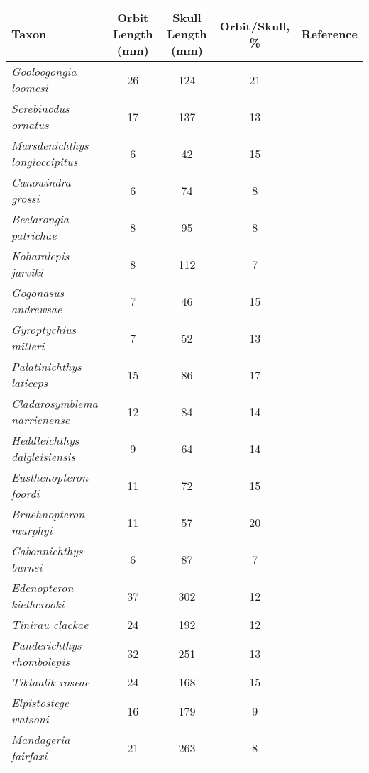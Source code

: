 \begin{tabular}{|L{4.5cm}|c|c|c|L{4.5cm}|}
\hline
\textbf{Taxon}&\textbf{Orbit Length (mm)}&\textbf{Skull Length (mm)}&\textbf{Orbit/Skull, \%}&\textbf{Reference}\\\hline
\textit{Gooloogongia loomesi}&26&124&21&\citet{Joha98a}\\\hline
\textit{Screbinodus ornatus}&17&137&13&\citet{Jeff12a}\\\hline
\textit{Marsdenichthys longioccipitus}&6&42&15&\citet{Holl10a}\\\hline
\textit{Canowindra grossi}&6&74&8&\citet{Long85a}\\\hline
\textit{Beelarongia patrichae}&8&95&8&\citet{Long87a}\\\hline
\textit{Koharalepis jarviki}&8&112&7&\citet{Youn92a}\\\hline
\textit{Gogonasus andrewsae}&7&46&15&\citet{Long06a}\\\hline
\textit{Gyroptychius  milleri}&7&52&13&\citet{Newm15a}\\\hline
\textit{Palatinichthys laticeps}&15&86&17&\citet{Witz12a}\\\hline
\textit{Cladarosymblema narrienense}&12&84&14&\citet{Fox95a}\\\hline
\textit{Heddleichthys dalgleisiensis}&9&64&14&\citet{Snit09a}\\\hline
\textit{Eusthenopteron foordi}&11&72&15&\citet{Mark07a}\\\hline
\textit{Bruehnopteron  murphyi}&11&57&20&\citet{Schu12a}\\\hline
\textit{Cabonnichthys burnsi}&6&87&7&\citet{Ahlb97a}\\\hline
\textit{Edenopteron kiethcrooki}&37&302&12&\citet{Youn13a}\\\hline
\textit{Tinirau clackae}&24&192&12&\citet{Swar12a}\\\hline
\textit{Panderichthys rhombolepis}&32&251&13&\citet{Voro91a}\\\hline
\textit{Tiktaalik roseae}&24&168&15&\citet{Daes06a}\\\hline
\textit{Elpistostege watsoni}&16&179&9&\citet{Schu85a}\\\hline
\textit{Mandageria fairfaxi}&21&263&8&\citet{Joha97a}\\\hline
\end{tabular}
